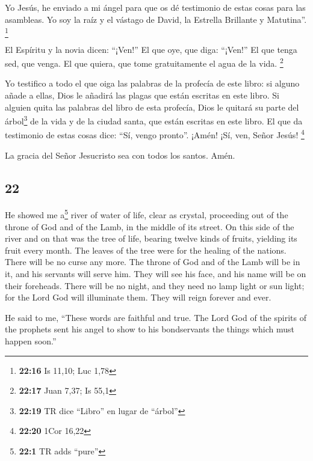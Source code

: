 \begin{paracol}{2}
 Yo Jesús, he enviado a mi ángel para que os dé
testimonio de estas cosas para las asambleas. Yo soy la raíz y el
vástago de David, la Estrella Brillante y Matutina''. \footnote{\textbf{22:16}
  Is 11,10; Luc 1,78}

 El Espíritu y la novia dicen: ``¡Ven!'' El que oye, que
diga: ``¡Ven!'' El que tenga sed, que venga. El que quiera, que tome
gratuitamente el agua de la vida. \footnote{\textbf{22:17} Juan 7,37; Is
  55,1}

 Yo testifico a todo el que oiga las palabras de la
profecía de este libro: si alguno añade a ellas, Dios le añadirá las
plagas que están escritas en este libro.  Si alguien
quita las palabras del libro de esta profecía, Dios le quitará su parte
del árbol\footnote{\textbf{22:19} TR dice ``Libro'' en lugar de
  ``árbol''} de la vida y de la ciudad santa, que están escritas en este
libro.  El que da testimonio de estas cosas dice: ``Sí,
vengo pronto''. ¡Amén! ¡Sí, ven, Señor Jesús! \footnote{\textbf{22:20}
  1Cor 16,22}

 La gracia del Señor Jesucristo sea con todos los santos.
Amén. \switchcolumn \begin{otherlanguage}{english}

\hypertarget{section-43}{%
\section{22}\label{section-43}}

 He showed me a\footnote{\textbf{22:1} TR adds ``pure''}
river of water of life, clear as crystal, proceeding out of the throne
of God and of the Lamb,  in the middle of its street. On
this side of the river and on that was the tree of life, bearing twelve
kinds of fruits, yielding its fruit every month. The leaves of the tree
were for the healing of the nations.  There will be no
curse any more. The throne of God and of the Lamb will be in it, and his
servants will serve him.  They will see his face, and his
name will be on their foreheads.  There will be no night,
and they need no lamp light or sun light; for the Lord God will
illuminate them. They will reign forever and ever.

 He said to me, ``These words are faithful and true. The
Lord God of the spirits of the prophets sent his angel to show to his
bondservants the things which must happen soon.''


\end{otherlanguage}
\end{paracol}
